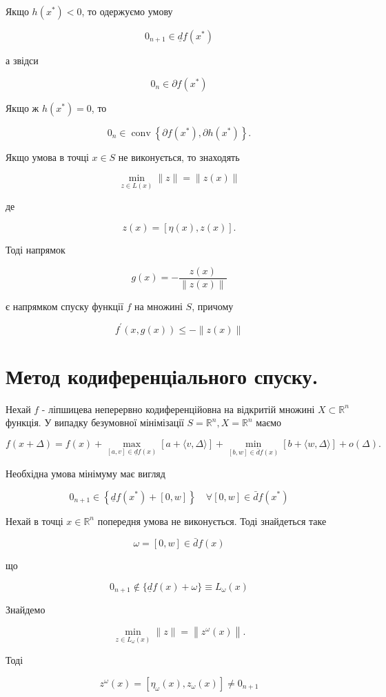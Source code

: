 \documentclass[10pt]{article}
\begin{document}
Якщо $h\left(x^{*}\right)<0$, то одержуємо умову

$$
0_{n+1} \in \underline{d} f\left(x^{*}\right)
$$

а звідси

$$
0_{n} \in \partial f\left(x^{*}\right)
$$

Якщо ж $h\left(x^{*}\right)=0$, то

$$
0_{n} \in \operatorname{conv}\left\{\partial f\left(x^{*}\right), \partial h\left(x^{*}\right)\right\} .
$$

Якщо умова в точці $x \in S$ не виконується, то знаходять

$$
\min _{z \in L(x)}\|z\|=\|z(x)\|
$$

де

$$
z(x)=[\eta(x), z(x)] .
$$

Тоді напрямок

$$
g(x)=-\frac{z(x)}{\|z(x)\|}
$$

є напрямком спуску функції $f$ на множині $S$, причому

$$
f^{\prime}(x, g(x)) \leq-\|z(x)\|
$$

\section*{Метод кодиференціального спуску.}
Нехай $f$ - ліпшицева неперервно кодиференційовна на відкритій множині $X \subset \mathbb{R}^{n}$ функція. У випадку безумовної мінімізації $S=\mathbb{R}^{n}, X=\mathbb{R}^{n}$ маємо

$$
f(x+\Delta)=f(x)+\max _{[a, v] \in \underline{d} f(x)}[a+\langle v, \Delta\rangle]+\min _{[b, w] \in \bar{d} f(x)}[b+\langle w, \Delta\rangle]+o(\Delta) .
$$

Необхідна умова мінімуму має вигляд

$$
0_{n+1} \in\left\{\underline{d} f\left(x^{*}\right)+[0, w]\right\} \quad \forall[0, w] \in \bar{d} f\left(x^{*}\right)
$$

Нехай в точці $x \in \mathbb{R}^{n}$ попередня умова не виконується. Тоді знайдеться таке

$$
\omega=[0, w] \in \bar{d} f(x)
$$

що

$$
0_{n+1} \notin\{\underline{d} f(x)+\omega\} \equiv L_{\omega}(x)
$$

Знайдемо

$$
\min _{z \in L_{\omega}(x)}\|z\|=\left\|z^{\omega}(x)\right\| .
$$

Тоді

$$
z^{\omega}(x)=\left[\eta_{\omega}(x), z_{\omega}(x)\right] \neq 0_{n+1}
$$
\end{document}
